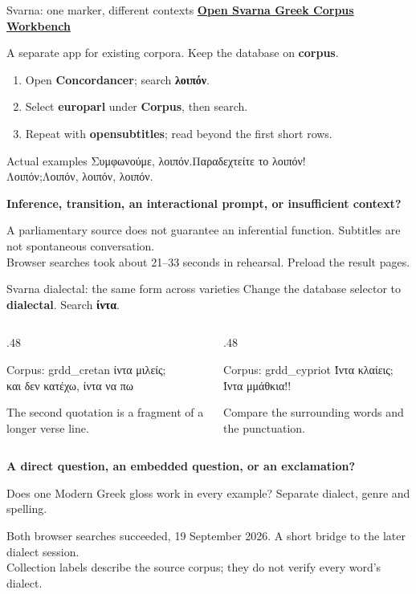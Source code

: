 \documentclass[aspectratio=169,10pt]{beamer}
\newcommand{\key}[1]{\textcolor{aegean}{\textbf{#1}}}
\newcommand{\source}[1]{\vfill{\scriptsize\color{slate}#1\par}}
\newcommand{\question}[1]{\medskip\par\key{#1}\par}
\begin{document}
\begin{frame}{Svarna: one marker, different contexts}
  \href{https://greek-corpus-workbench.wonderfulhill-e1c9f1a0.westeurope.azurecontainerapps.io}{\textbf{Open Svarna Greek Corpus Workbench}}\par\medskip
  \small A separate app for existing corpora. Keep the database on \key{corpus}.
  \begin{enumerate}
    \item Open \textbf{Concordancer}; search \key{λοιπόν}.
    \item Select \textbf{europarl} under \textbf{Corpus}, then search.
    \item Repeat with \textbf{opensubtitles}; read beyond the first short rows.
  \end{enumerate}
  \begin{block}{Actual examples}
    Συμφωνούμε, λοιπόν.\quad Παραδεχτείτε το λοιπόν!\\[6pt]
    Λοιπόν;\quad Λοιπόν, λοιπόν, λοιπόν.
  \end{block}
  \question{Inference, transition, an interactional prompt, or insufficient context?}
  \source{A parliamentary source does not guarantee an inferential function. Subtitles are not spontaneous conversation.\\
  Browser searches took about 21--33 seconds in rehearsal. Preload the result pages.}
\end{frame}

\begin{frame}{Svarna dialectal: the same form across varieties}
  \small Change the database selector to \key{dialectal}. Search \key{ίντα}.
  \begin{columns}[T]
    \begin{column}{.48\textwidth}
      \begin{block}{Corpus: grdd\_cretan}
        ίντα μιλείς;\\[8pt]
        και δεν κατέχω, ίντα να πω
      \end{block}
      \small The second quotation is a fragment of a longer verse line.
    \end{column}
    \begin{column}{.48\textwidth}
      \begin{block}{Corpus: grdd\_cypriot}
        Ίντα κλαίεις;\\[8pt]
        Ίντα μμάθκια!!
      \end{block}
      \small Compare the surrounding words and the punctuation.
    \end{column}
  \end{columns}
  \question{A direct question, an embedded question, or an exclamation?}
  \small Does one Modern Greek gloss work in every example? Separate dialect, genre and spelling.
  \source{Both browser searches succeeded, 19 September 2026. A short bridge to the later dialect session.\\
  Collection labels describe the source corpus; they do not verify every word's dialect.}
\end{frame}
\end{document}
